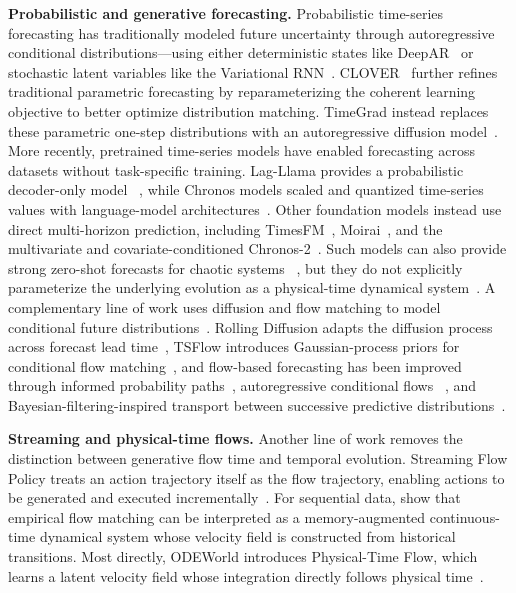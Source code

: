 \textbf{Probabilistic and generative forecasting.} Probabilistic time-series forecasting has traditionally modeled future uncertainty through autoregressive conditional distributions—using either deterministic states like DeepAR~\citep{salinas2020deepar} or stochastic latent variables like the Variational RNN~\citep{chung2015recurrent}. CLOVER~\citep{olivares2015clover} further refines traditional parametric forecasting by reparameterizing the coherent learning objective to better optimize distribution matching. TimeGrad instead replaces these parametric one-step distributions with an autoregressive diffusion model~\citep{rasul2021timegrad}. More recently, pretrained time-series models have enabled forecasting across datasets without task-specific training. Lag-Llama provides a probabilistic decoder-only model
~\citep{rasul2024lagllama}, while Chronos models scaled and quantized
time-series values with language-model architectures~\citep{ansari2024chronos}. Other foundation models instead use direct multi-horizon prediction, including TimesFM~\citep{das2024timesfm}, Moirai~\citep{woo2024moirai}, and the multivariate and covariate-conditioned Chronos-2~\citep{ansari2025chronos}. Such models can
also provide strong zero-shot forecasts for chaotic systems
~\citep{zhang2025zero}, but they do not explicitly parameterize the
underlying evolution as a physical-time dynamical system~\citep{karaouli2025foundational}. A complementary line of work uses diffusion and flow matching to model conditional future distributions~\citep{erichson2025flex}. Rolling Diffusion adapts the diffusion process across forecast lead time~\citep{ruhe2024rolling}, TSFlow introduces Gaussian-process priors for conditional flow matching~\citep{kollovieh2025tsflow}, and flow-based forecasting has been improved through informed probability paths~\citep{lim2025paths}, autoregressive conditional flows
~\citep{elgazzar2025flowtime}, and Bayesian-filtering-inspired transport between successive predictive distributions~\citep{huang2026sequential}. 

\textbf{Streaming and physical-time flows.} Another line of work removes the distinction between generative flow time and temporal evolution. Streaming Flow Policy treats an action trajectory itself as the flow trajectory, enabling actions to be generated and executed incrementally~\citep{jiang2025streaming}. For sequential data, \citet{lim2026flow} show that empirical flow matching can be interpreted as a memory-augmented continuous-time dynamical system whose velocity field is constructed from historical transitions. Most directly, ODEWorld introduces Physical-Time Flow, which learns a latent velocity field whose integration directly follows physical time~\citep{liu2026odeworld}.

